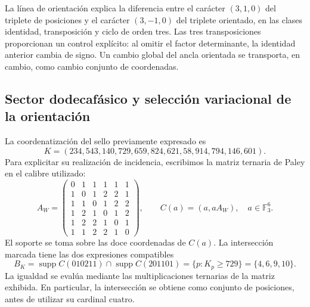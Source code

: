 La línea de orientación explica la diferencia entre el carácter
\((3,1,0)\) del triplete de posiciones y el carácter \((3,-1,0)\)
del triplete orientado, en las clases identidad, transposición y ciclo de
orden tres. Las tres transposiciones proporcionan un control explícito:
al omitir el factor determinante, la identidad anterior cambia de signo.
Un cambio global del ancla orientada se transporta, en cambio, como cambio
conjunto de coordenadas.

\subsection{Sector dodecafásico y selección variacional de la orientación}

La coordenatización del sello previamente expresado es
\begin{equation}
 K=(234,543,140,729,659,824,621,58,914,794,146,601).
 \label{eq:ii-witt-K-marked}
\end{equation}
Para explicitar su realización de incidencia, escribimos la matriz ternaria
de Paley en el calibre utilizado:
\[
 A_W=\begin{pmatrix}
 0&1&1&1&1&1\\
 1&0&1&2&2&1\\
 1&1&0&1&2&2\\
 1&2&1&0&1&2\\
 1&2&2&1&0&1\\
 1&1&2&2&1&0
 \end{pmatrix},
 \qquad C(a)=(a,aA_W),\quad a\in\mathbb F_3^6.
\]
El soporte se toma sobre las doce coordenadas de \(C(a)\). La
intersección marcada tiene las dos expresiones compatibles
\begin{equation}
 B_K=\operatorname{supp}C(010211)\cap\operatorname{supp}C(201101)
     =\{p:K_p\ge729\}=\{4,6,9,10\}.
 \label{eq:ii-witt-B-marked}
\end{equation}
La igualdad se evalúa mediante las multiplicaciones ternarias de la matriz
exhibida. En particular, la intersección se obtiene como conjunto de
posiciones, antes de utilizar su cardinal cuatro.

